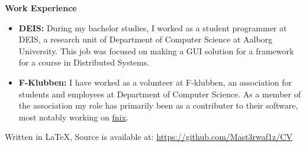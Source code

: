 \documentclass[a4paper, 14pt]{article}
\newcommand{\myitem}[1]{\item[\color{myorange}$\circ$]#1}
\newcommand{\newcvsection}[2]{
    \noindent\huge \textbf{#1} \color{myorange}\hrulefill\color{black}
    
    \normalsize
    #2    
    \vspace{.5cm}
}
\begin{document}
    \newcvsection{Work Experience}{
        \begin{itemize}
            \myitem{
                \textbf{DEIS: } During my bachelor studies, I worked as a student programmer at DEIS, a research unit of Department of Computer Science at Aalborg University. 
                This job was focused on making a GUI solution for a framework for a course in Distributed Systems.
            }
                
            \myitem{
                \textbf{F-Klubben: } I have worked as a volunteer at F-klubben, an association for students and employees at Department of Computer Science. 
                As a member of the association my role has primarily been as a contributer to their software, most notably working on \href{https://github.com/f-klubben/fnix}{fnix}.
            }
        \end{itemize}
    }

    \vspace*{\fill}
    \tiny Written in \LaTeX, Source is available at: \href{https://github.com/Mast3rwaf1z/CV}{https://github.com/Mast3rwaf1z/CV}
\end{document}
